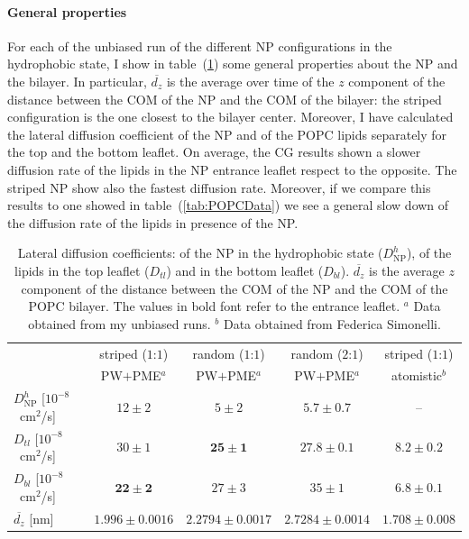 \paragraph{\textbf{General properties}} For each of the unbiased run of the different \ac{NP} configurations in the hydrophobic state, I show in table~(\ref{tab:NPMembProperties}) some general properties about the \ac{NP} and the bilayer. In particular, $\overline{d_z}$ is the average over time of the $z$ component of the distance between the \ac{COM} of the \ac{NP} and the \ac{COM} of the bilayer: the striped configuration is the one closest to the bilayer center. Moreover, I have calculated the lateral diffusion coefficient of the \ac{NP} and of the \ac{POPC} lipids separately for the top and the bottom leaflet. On average, the \ac{CG} results shown a slower diffusion rate of the lipids in the \ac{NP} entrance leaflet respect to the opposite. The striped \ac{NP} show also the fastest diffusion rate. Moreover, if we compare this results to one showed in table~(\ref{tab:POPCData}) we see a general slow down of the diffusion rate of the lipids in presence of the \ac{NP}.
\begin{table}[h!t]
	\centering\footnotesize
	\begin{tabular}{lcccc}
		\toprule
		\,		& striped ($1$:$1$)		& random ($1$:$1$)		& random ($2$:$1$)	& striped ($1$:$1$)	\\
		\,		& \acs{PW}$+$\acs{PME}$^a$ & \acs{PW}$+$\acs{PME}$^a$ & \acs{PW}$+$\acs{PME}$^a$ & atomistic$^b$ \\ \toprule
		$D^h_{\text{NP}}$ [$10^{-8}$~cm$^2$/s] & $12 \pm 2$ & $5 \pm 2$ & $5.7 \pm 0.7$ & –		 \\ \midrule
		$D_{tl}$ [$10^{-8}$~cm$^2$/s] & $30 \pm 1$ & $\mathbf{25 \pm 1}$ & $\mathbf{27.8 \pm 0.1}$	& $\mathbf{8.2 \pm 0.2}$	\\ \midrule
		$D_{bl}$ [$10^{-8}$~cm$^2$/s] & $\mathbf{22 \pm 2}$ & $27 \pm 3$	& $35 \pm 1$	& $6.8 	\pm 0.1$		\\ \midrule
		$\overline{d_z}$ [nm] & $1.996 \pm 0.0016$	& $2.2794 \pm 0.0017$	& $2.7284 \pm 0.0014$	& $1.708 \pm 0.008$\\ \bottomrule
	\end{tabular}
	\caption{Lateral diffusion coefficients: of the \acs{NP} in the hydrophobic state ($D^h_\text{NP}$), of the lipids in the top leaflet ($D_{tl}$) and in the bottom leaflet ($D_{bl}$). $\overline{d_z}$ is the average $z$ component of the distance between the \acs{COM} of the \acs{NP} and the \acs{COM} of the \acs{POPC} bilayer. The values in bold font refer to the entrance leaflet. $^a$ Data obtained from my unbiased runs. $^b$ Data obtained from Federica Simonelli.}%
	\label{tab:NPMembProperties}
\end{table}

